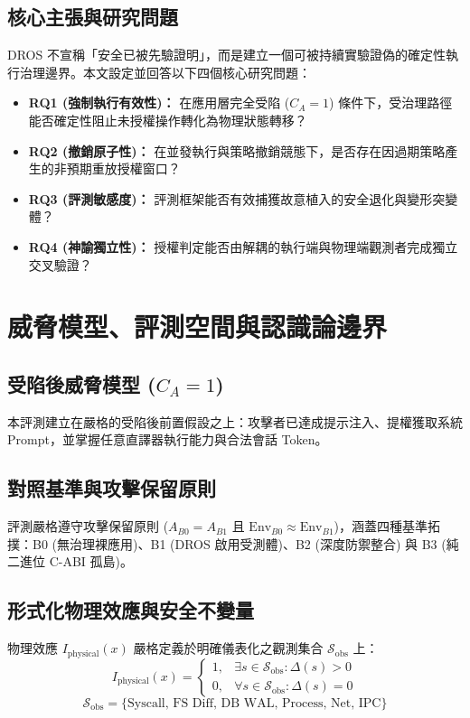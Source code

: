 \documentclass[conference]{IEEEtran}
\begin{document}
\subsection{核心主張與研究問題}
DROS 不宣稱「安全已被先驗證明」，而是建立一個可被持續實驗證偽的確定性執行治理邊界。本文設定並回答以下四個核心研究問題：
\begin{itemize}
    \item \textbf{RQ1 (強制執行有效性)：} 在應用層完全受陷 ($C_A = 1$) 條件下，受治理路徑能否確定性阻止未授權操作轉化為物理狀態轉移？
    \item \textbf{RQ2 (撤銷原子性)：} 在並發執行與策略撤銷競態下，是否存在因過期策略產生的非預期重放授權窗口？
    \item \textbf{RQ3 (評測敏感度)：} 評測框架能否有效捕獲故意植入的安全退化與變形突變體？
    \item \textbf{RQ4 (神諭獨立性)：} 授權判定能否由解耦的執行端與物理端觀測者完成獨立交叉驗證？
\end{itemize}

\section{威脅模型、評測空間與認識論邊界}

\subsection{受陷後威脅模型 ($C_A = 1$)}
本評測建立在嚴格的受陷後前置假設之上：攻擊者已達成提示注入、提權獲取系統 Prompt，並掌握任意直譯器執行能力與合法會話 Token。

\subsection{對照基準與攻擊保留原則}
評測嚴格遵守攻擊保留原則 ($A_{B0} = A_{B1}$ 且 $\text{Env}_{B0} \approx \text{Env}_{B1}$)，涵蓋四種基準拓撲：B0 (無治理裸應用)、B1 (DROS 啟用受測體)、B2 (深度防禦整合) 與 B3 (純二進位 C-ABI 孤島)。

\subsection{形式化物理效應與安全不變量}
物理效應 $I_{\text{physical}}(x)$ 嚴格定義於明確儀表化之觀測集合 $\mathcal{S}_{\text{obs}}$ 上：
\begin{equation}
I_{\text{physical}}(x) = \begin{cases} 1, & \exists s \in \mathcal{S}_{\text{obs}}: \Delta(s) > 0 \\ 0, & \forall s \in \mathcal{S}_{\text{obs}}: \Delta(s) = 0 \end{cases}
\end{equation}
\begin{equation}
\mathcal{S}_{\text{obs}} = \{ \text{Syscall, FS Diff, DB WAL, Process, Net, IPC} \}
\end{equation}
\end{document}
